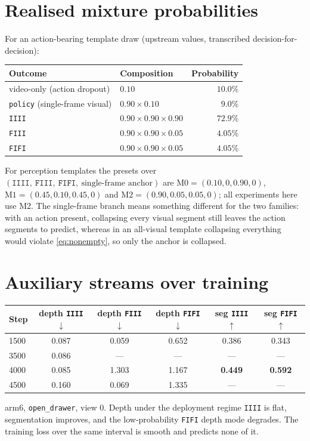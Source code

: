 \documentclass{article} %
\newcommand{\best}[1]{\textbf{#1}}
\begin{document}
\section{Realised mixture probabilities}
\label{app:mixture}

For an action-bearing template draw (upstream values, transcribed decision-for-decision):
\begin{center}\small
\begin{tabular}{llr}
\toprule
\textbf{Outcome} & \textbf{Composition} & \textbf{Probability} \\
\midrule
video-only (action dropout)           & $0.10$ & $10.0\%$ \\
\texttt{policy} (single-frame visual) & $0.90\times0.10$ & $9.0\%$ \\
\texttt{IIII} & $0.90\times0.90\times0.90$ & $72.9\%$ \\
\texttt{FIII} & $0.90\times0.90\times0.05$ & $4.05\%$ \\
\texttt{FIFI} & $0.90\times0.90\times0.05$ & $4.05\%$ \\
\bottomrule
\end{tabular}
\end{center}
For perception templates the presets over
$(\texttt{IIII},\ \texttt{FIII},\ \texttt{FIFI},\ \text{single-frame anchor})$ are
$\mathrm{M0}=(0.10,0,0.90,0)$, $\mathrm{M1}=(0.45,0.10,0.45,0)$ and
$\mathrm{M2}=(0.90,0.05,0.05,0)$; all experiments here use M2. The single-frame branch means
something different for the two families: with an action present, collapsing every visual segment
still leaves the action segments to predict, whereas in an all-visual template collapsing
everything would violate \eqref{eq:nonempty}, so only the anchor is collapsed.

\section{Auxiliary streams over training}
\label{app:overtraining}

\begin{center}\small
\begin{tabular}{lccccc}
\toprule
\textbf{Step} & depth \texttt{IIII} $\downarrow$ & depth \texttt{FIII} $\downarrow$ & depth \texttt{FIFI} $\downarrow$ & seg \texttt{IIII} $\uparrow$ & seg \texttt{FIFI} $\uparrow$ \\
\midrule
1500 & 0.087 & 0.059 & 0.652 & 0.386 & 0.343 \\
3500 & 0.086 & --- & --- & --- & --- \\
4000 & 0.085 & 1.303 & 1.167 & \best{0.449} & \best{0.592} \\
4500 & 0.160 & 0.069 & 1.335 & --- & --- \\
\bottomrule
\end{tabular}
\end{center}
arm6, \texttt{open\_drawer}, view 0. Depth under the deployment regime \texttt{IIII} is flat,
segmentation improves, and the low-probability \texttt{FIFI} depth mode degrades. The training loss
over the same interval is smooth and predicts none of it.
\end{document}
